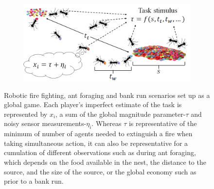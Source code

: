 \documentclass[12pt]{article}
\begin{document}
\begin{figure}[ht!]
\begin{subfigure}[t]{0.5\textwidth}
        \caption{}
    \end{subfigure}
    \begin{subfigure}[t]{1\textwidth}
        \centering
        \includegraphics[width=1\textwidth]{figures/foraging.png}
        \caption{}
    \end{subfigure}    
    \caption{Robotic fire fighting, ant foraging and bank run scenarios set up as a global game. Each player's imperfect estimate of the task is represented by $x_i$, a sum of the global magnitude parameter-$\tau$ and noisy sensor measurements-$\eta_i$. Whereas $\tau$ is representative of the minimum of number of agents needed to extinguish a fire when taking simultaneous action, it can also be representative for a cumulation of different observations such as during ant foraging, which depends on the food available in the nest, the distance to the source, and the size of the source, or the global economy such as prior to a bank run.}    
\end{figure}
\end{document}
